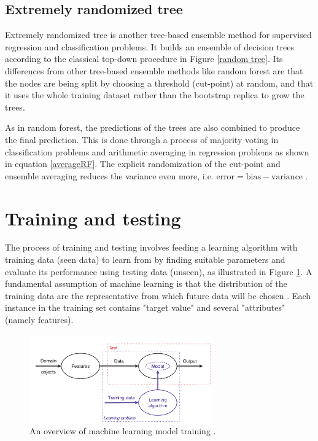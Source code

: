 \subsection{Extremely randomized tree}

Extremely randomized tree is another tree-based ensemble method for supervised regression and classification problems. It builds an ensemble of decision trees according to the classical top-down procedure in Figure \ref{random tree}. Its differences from other tree-based ensemble methods like random forest are that the nodes are being split by choosing a threshold (cut-point) at random, and that it uses the whole training dataset rather than the bootstrap replica to grow the trees.  

As in random forest, the predictions of the trees are also combined to produce the final prediction. This is done through a process of majority voting in classification problems and arithmetic averaging in regression problems as shown in equation \ref{averageRF}. The explicit randomization of the cut-point and ensemble averaging reduces the variance even more, i.e. $\text{error}=\text{bias} - \text{variance}$ \citep{geurts2006extremely}. 
\section{Training and testing}
\label{TT}
The process of training and testing involves feeding a learning algorithm with training data (seen data) to learn from by finding suitable parameters and evaluate its performance using testing data (unseen), as illustrated in Figure \ref{overview}. A fundamental assumption of machine learning is that the distribution of the training data are the representative from which future data will be chosen \citep{witten2016data}. Each instance in the training set contains "target value" and several "attributes" (namely features). 

\begin{figure}[H]
  \centering
    \includegraphics[width=0.7\textwidth]{images/MLSampler.png}
    \caption{An overview of machine learning model training \citep{flach2012machine}.}
  \label{overview}
\end{figure}

